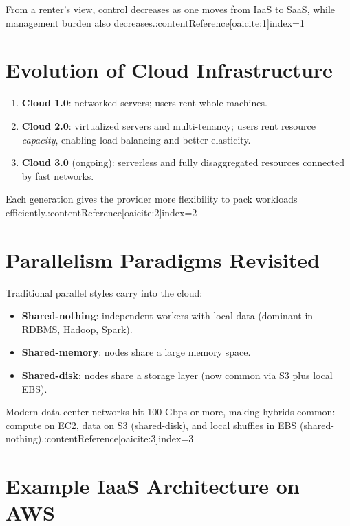 \documentclass[11pt]{article}
\begin{document}
From a renter’s view, control decreases as one moves from IaaS to SaaS, while management burden also decreases.:contentReference[oaicite:1]{index=1}

\section{Evolution of Cloud Infrastructure}

\begin{enumerate}[itemsep=0pt]
  \item \textbf{Cloud 1.0}: networked servers; users rent whole machines.
  \item \textbf{Cloud 2.0}: virtualized servers and multi-tenancy; users rent resource \emph{capacity}, enabling load balancing and better elasticity.
  \item \textbf{Cloud 3.0} (ongoing): serverless and fully disaggregated resources connected by fast networks.
\end{enumerate}
Each generation gives the provider more flexibility to pack workloads efficiently.:contentReference[oaicite:2]{index=2}

\section{Parallelism Paradigms Revisited}

Traditional parallel styles carry into the cloud:

\begin{itemize}[itemsep=0pt]
  \item \textbf{Shared-nothing}: independent workers with local data (dominant in RDBMS, Hadoop, Spark).
  \item \textbf{Shared-memory}: nodes share a large memory space.
  \item \textbf{Shared-disk}: nodes share a storage layer (now common via S3 plus local EBS).
\end{itemize}

Modern data-center networks hit 100 Gbps or more, making hybrids common: compute on EC2, data on S3 (shared-disk), and local shuffles in EBS (shared-nothing).:contentReference[oaicite:3]{index=3}

\section{Example IaaS Architecture on AWS}
\end{document}

